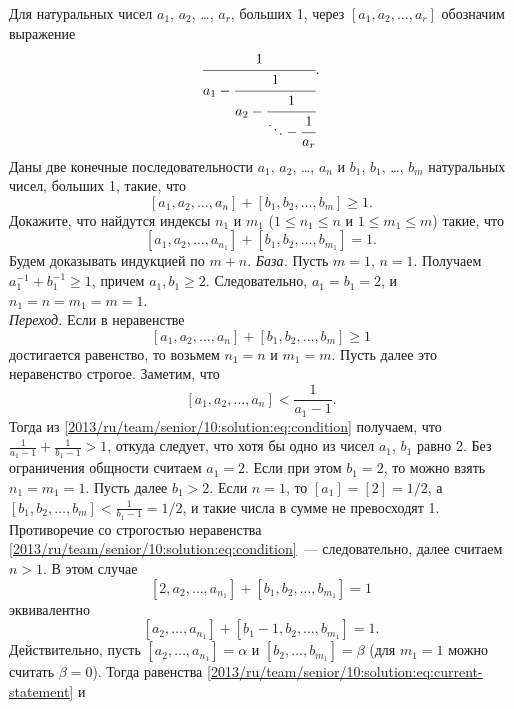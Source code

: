 \problem{}
Для натуральных чисел $a_1$, $a_2$, \ldots, $a_r$, больших 1, через
$[a_1, a_2, \ldots, a_r]$ обозначим выражение
\[
    \cfrac{1}{
        a_1 - \cfrac{1}{
            a_2 - \cfrac{1}{
                \ddots - \cfrac{1}{a_r} } } }
.\]
Даны две конечные последовательности
$a_1$, $a_2$, \ldots, $a_n$ и $b_1$, $b_1$, \ldots, $b_m$
натуральных чисел, больших 1, такие, что
\[
    [a_1, a_2, \ldots, a_n] + [b_1, b_2, \ldots, b_m] \geq 1
.\]
Докажите, что найдутся индексы $n_1$ и $m_1$
($1 \leq n_1 \leq n$ и $1 \leq m_1 \leq m$)
такие, что
\[
    [a_1, a_2, \ldots, a_{n_1}] + [b_1, b_2, \ldots, b_{m_1}] = 1
.\]
\solution
Будем доказывать индукцией по $m + n$.
\emph{База.}
Пусть $m = 1$, $n = 1$.
Получаем $a_1^{-1} + b_1^{-1} \geq 1$, причем $a_1, b_1 \geq 2$.
Следовательно, $a_1 = b_1 = 2$, и $n_1 = n = m_1 = m = 1$.
\\
\emph{Переход.}
Если в неравенстве
\begin{equation} \label{2013/ru/team/senior/10:solution:eq:condition}
    [a_1, a_2, \ldots, a_n] + [b_1, b_2, \ldots, b_m] \geq 1
\end{equation}
достигается равенство, то возьмем $n_1 = n$ и $m_1 = m$.
Пусть далее это неравенство строгое.
Заметим, что
\[
    [a_1, a_2, \ldots, a_n] < \frac{1}{a_1 - 1}
.\]
Тогда из \eqref{2013/ru/team/senior/10:solution:eq:condition} получаем, что
$\frac{1}{a_1 - 1} + \frac{1}{b_1 - 1} > 1$, откуда следует, что хотя бы одно
из чисел $a_1$, $b_1$ равно 2.
Без ограничения общности считаем $a_1 = 2$.
Если при этом $b_1 = 2$, то можно взять $n_1 = m_1 = 1$.
Пусть далее $b_1 > 2$.
Если $n = 1$, то $[a_1] = [2] = 1/2$,
а $[b_1, b_2, \ldots, b_m] < \frac{1}{b_1 - 1} = 1/2$,
и такие числа в сумме не превосходят 1.
Противоречие со строгостью неравенства
\eqref{2013/ru/team/senior/10:solution:eq:condition}~---
следовательно, далее считаем $n > 1$.
В этом случае
\begin{equation} \label{2013/ru/team/senior/10:solution:eq:current-statement}
    [2, a_2, \ldots, a_{n_1}] + [b_1, b_2, \ldots, b_{m_1}] = 1
\end{equation}
эквивалентно
\begin{equation} \label{2013/ru/team/senior/10:solution:eq:previous-statement}
    [a_2, \ldots, a_{n_1}] + [b_1 - 1, b_2, \ldots, b_{m_1}] = 1
.\end{equation}
Действительно, пусть $[a_2, \ldots, a_{n_1}] = \alpha$ и
$[b_2, \ldots, b_{m_1}] = \beta$ (для $m_1 = 1$ можно считать $\beta = 0$).
Тогда равенства
\eqref{2013/ru/team/senior/10:solution:eq:current-statement} и
